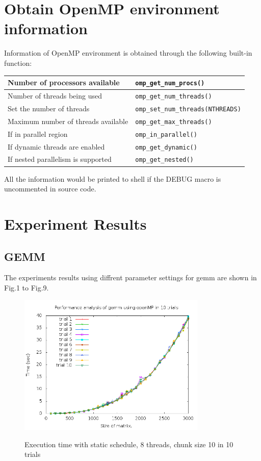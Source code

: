 \documentclass{article}
\begin{document}
\newpage
\section{Obtain OpenMP environment information}
Information of OpenMP environment is obtained through the following built-in function:
\begin{table}[h]
\begin{center}
\begin{tabular}{| l | l |}
\hline
Number of processors available & \verb+omp_get_num_procs()+\\
\hline
Number of threads being used & \verb+omp_get_num_threads()+\\
\hline
Set the number of threads & \verb+omp_set_num_threads(NTHREADS)+\\
\hline
Maximum number of threads available & \verb+omp_get_max_threads()+\\
\hline
If in parallel region & \verb+omp_in_parallel()+ \\
\hline
If dynamic threads are enabled & \verb+omp_get_dynamic()+\\
\hline
If nested parallelism is supported & \verb+omp_get_nested()+\\
\hline
\end{tabular}
\end{center}
\end{table}

All the information would be printed to shell if the DEBUG macro is uncommented in source code.

\newpage
\section{Experiment Results}
\subsection{GEMM}
The experiments results using diffrent parameter settings for gemm are shown in Fig.1 to Fig.9.

    \begin{figure}[th!]
        \centering
        \includegraphics[width=0.8\textwidth]{static_ck10_8.png}
        \label{fig:1}
        \caption{Execution time with static schedule, 8 threads, chunk size 10 in 10 trials}
    \end{figure}
\end{document}
